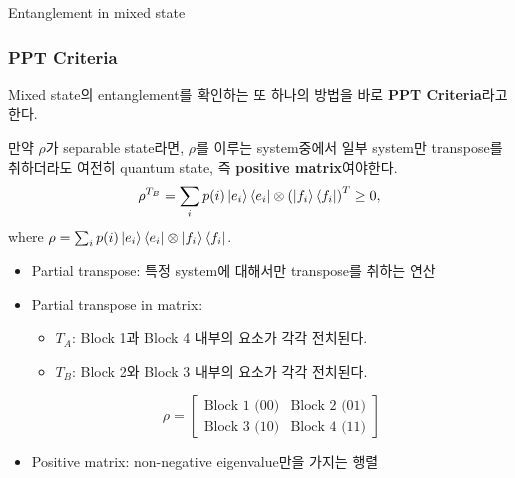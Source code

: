 \documentclass[9pt]{beamer}
\begin{document}
\begin{section}{Entanglement in mixed state}
        \begin{frame}
            \frametitle{PPT Criteria}
            Mixed state의 entanglement를 확인하는 또 하나의 방법을 바로 \textbf{PPT Criteria}라고 한다. 
            \begin{theorem}
                만약 $\rho$가 separable state라면, $\rho$를 이루는 system중에서 일부 system만 \alert{transpose}를 취하더라도 여전히 quantum state, 즉 \textbf{positive matrix}여야한다.
                \begin{equation*}
                    \rho^{T_B} = \sum_i p(i) \ket{e_i}\bra{e_i} \otimes \left(\ket{f_i} \bra{f_i}\right)^T \ge 0,
                \end{equation*}
                where $\rho = \sum_i p(i) \ket{e_i} \bra{e_i} \otimes \ket{f_i} \bra{f_i}$.
            \end{theorem}
            \vspace{0.2cm}
            \begin{itemize}
                \item Partial transpose: 특정 system에 대해서만 transpose를 취하는 연산
                \item Partial transpose in matrix: 
                \begin{itemize}
                    \item $T_A$: Block 1과 Block 4 내부의 요소가 각각 전치된다.
                    \item $T_B$: Block 2와 Block 3 내부의 요소가 각각 전치된다.
                \end{itemize}
                \begin{equation*}
                    \rho =
                    \begin{bmatrix}
                    \text{Block 1 (00)} & \text{Block 2 (01)} \\
                    \text{Block 3 (10)} & \text{Block 4 (11)}
                    \end{bmatrix}
                \end{equation*}
                \item Positive matrix: non-negative eigenvalue만을 가지는 행렬
            \end{itemize}
            
        \end{frame}


\end{section}
\end{document}
